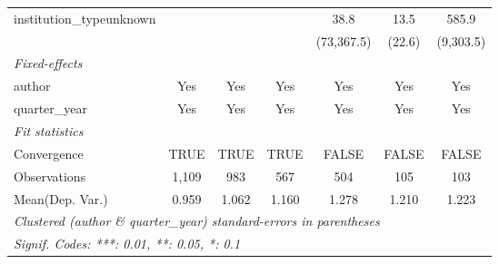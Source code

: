 \begin{tabular}{lcccccc}
   institution\_typeunknown              &               &               &              & 38.8       & 13.5      & 585.9\\   
                                         &               &               &              & (73,367.5) & (22.6)    & (9,303.5)\\   
   \midrule
   \emph{Fixed-effects}\\
   author                                & Yes           & Yes           & Yes          & Yes        & Yes       & Yes\\  
   quarter\_year                         & Yes           & Yes           & Yes          & Yes        & Yes       & Yes\\  
   \midrule
   \emph{Fit statistics}\\
   Convergence                           &TRUE           & TRUE          & TRUE         & FALSE      & FALSE     & FALSE\\  
   Observations                          & 1,109         & 983           & 567          & 504        & 105       & 103\\  
Mean(Dep. Var.) & 0.959 & 1.062 & 1.160 & 1.278 & 1.210 & 1.223 \\
   \midrule \midrule
   \multicolumn{7}{l}{\emph{Clustered (author \& quarter\_year) standard-errors in parentheses}}\\
   \multicolumn{7}{l}{\emph{Signif. Codes: ***: 0.01, **: 0.05, *: 0.1}}\\
\end{tabular}
\par\endgroup
